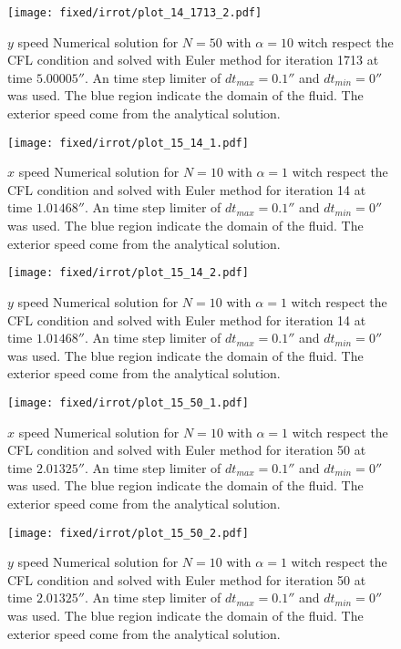 \begin{figure}
\texttt{[image: fixed/irrot/plot\_14\_1713\_2.pdf]}
\caption{$y$ speed Numerical solution for $N=50$ with $\alpha=10$ witch respect the CFL condition and solved with Euler method
for iteration 1713 at time $\unit{5.00005}{\second}$.
An time step limiter of $dt_{max}=\unit{0.1}{\second}$ and $dt_{min}=\unit{0}{\second}$ was used.
The blue region indicate the domain of the fluid. The exterior speed come from the analytical solution.
}
\end{figure}

\begin{figure}
\texttt{[image: fixed/irrot/plot\_15\_14\_1.pdf]}
\caption{$x$ speed Numerical solution for $N=10$ with $\alpha=1$ witch respect the CFL condition and solved with Euler method
for iteration 14 at time $\unit{1.01468}{\second}$.
An time step limiter of $dt_{max}=\unit{0.1}{\second}$ and $dt_{min}=\unit{0}{\second}$ was used.
The blue region indicate the domain of the fluid. The exterior speed come from the analytical solution.
}
\end{figure}
\begin{figure}
\texttt{[image: fixed/irrot/plot\_15\_14\_2.pdf]}
\caption{$y$ speed Numerical solution for $N=10$ with $\alpha=1$ witch respect the CFL condition and solved with Euler method
for iteration 14 at time $\unit{1.01468}{\second}$.
An time step limiter of $dt_{max}=\unit{0.1}{\second}$ and $dt_{min}=\unit{0}{\second}$ was used.
The blue region indicate the domain of the fluid. The exterior speed come from the analytical solution.
}
\end{figure}

\begin{figure}
\texttt{[image: fixed/irrot/plot\_15\_50\_1.pdf]}
\caption{$x$ speed Numerical solution for $N=10$ with $\alpha=1$ witch respect the CFL condition and solved with Euler method
for iteration 50 at time $\unit{2.01325}{\second}$.
An time step limiter of $dt_{max}=\unit{0.1}{\second}$ and $dt_{min}=\unit{0}{\second}$ was used.
The blue region indicate the domain of the fluid. The exterior speed come from the analytical solution.
}
\end{figure}
\begin{figure}
\texttt{[image: fixed/irrot/plot\_15\_50\_2.pdf]}
\caption{$y$ speed Numerical solution for $N=10$ with $\alpha=1$ witch respect the CFL condition and solved with Euler method
for iteration 50 at time $\unit{2.01325}{\second}$.
An time step limiter of $dt_{max}=\unit{0.1}{\second}$ and $dt_{min}=\unit{0}{\second}$ was used.
The blue region indicate the domain of the fluid. The exterior speed come from the analytical solution.
}
\end{figure}

